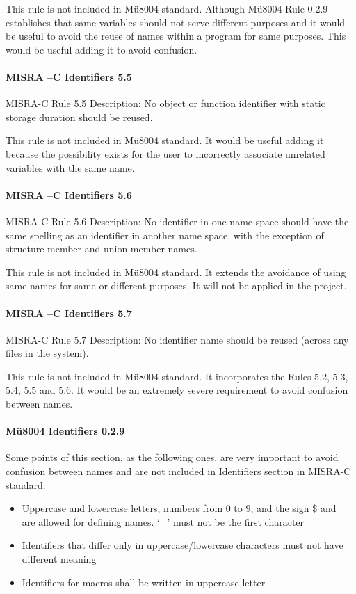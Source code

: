 This rule is not included in Mü8004 standard. Although Mü8004 Rule 0.2.9 establishes that same variables should not serve different purposes and it would be useful to avoid the reuse of names within a program for same purposes. This would be useful adding it to avoid confusion.


\paragraph{MISRA –C Identifiers 5.5}
MISRA-C Rule 5.5 Description: No object or function identifier with static storage duration should be reused.

This rule is not included in Mü8004 standard. It would be useful adding it because the possibility exists for the user to incorrectly associate unrelated variables with the same name.

\paragraph{MISRA –C Identifiers 5.6}
MISRA-C Rule 5.6 Description: No identifier in one name space should have the same spelling as an identifier in another name space, with the exception of structure member and union member names.

This rule is not included in Mü8004 standard. It extends the avoidance of using same names for same or different purposes. It will not be applied in the project. 

\paragraph{MISRA –C Identifiers 5.7}
MISRA-C Rule 5.7 Description: No identifier name should be reused (across any files in the system).

This rule is not included in Mü8004 standard. It incorporates the Rules 5.2, 5.3, 5.4, 5.5 and 5.6. It would be an extremely severe requirement to avoid confusion between names.

\paragraph{Mü8004 Identifiers 0.2.9}
Some points of this section, as the following ones, are very important to avoid confusion between names and are not included in Identifiers section in MISRA-C standard:
\begin{itemize}
\item Uppercase and lowercase letters, numbers from 0 to 9, and the sign \$ and \_ are allowed for defining names. ‘\_’ must not be the first character
\item Identifiers that differ only in uppercase/lowercase characters must not have different meaning
\item Identifiers for macros shall be written in uppercase letter
\end{itemize}

